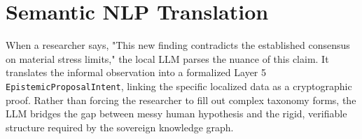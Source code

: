 \section{Semantic NLP Translation}
When a researcher says, "This new finding contradicts the established consensus on material stress limits," the local LLM parses the nuance of this claim. It translates the informal observation into a formalized Layer 5 \texttt{EpistemicProposalIntent}, linking the specific localized data as a cryptographic proof. Rather than forcing the researcher to fill out complex taxonomy forms, the LLM bridges the gap between messy human hypothesis and the rigid, verifiable structure required by the sovereign knowledge graph.
